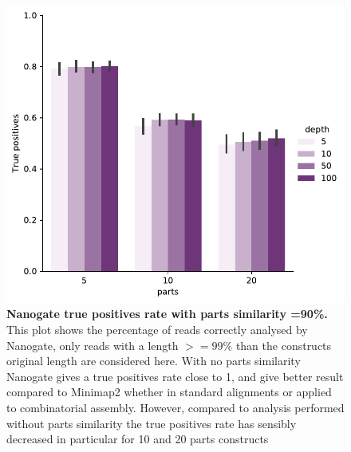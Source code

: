 \documentclass[11pt, a4paper]{article}
\begin{document}
\begin{figure}[ht]
    \begin{center}
    \includegraphics[width=1\textwidth]{../results/images_notebook/v_400/nanogate_sim_90_good_reads_true_positves.pdf}
    \end{center}
    \caption{{\bf  Nanogate true positives rate with parts similarity =90\%.} This plot shows the percentage of reads correctly analysed by Nanogate, only reads with a length $>=99\%$ than the constructs original length are considered here. With no parts similarity Nanogate gives a true positives rate close to 1,
    and give better result compared to Minimap2 whether in standard alignments or applied to combinatorial assembly. However, compared to analysis performed without parts similarity the true positives rate has sensibly decreased in particular for 10 and 20 parts constructs }
   \label{fig:v_400_nanogate_accuracy_sim_90}
\end{figure}
\end{document}
